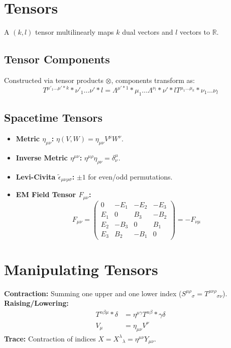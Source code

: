 \documentclass[11pt, a4paper]{report}
\begin{document}
\section{Tensors}
A $(k, l)$ tensor multilinearly maps $k$ dual vectors and $l$ vectors to $\mathbb{R}$.

\subsection*{Tensor Components}
Constructed via tensor products $\otimes$, components transform as:
\begin{equation}
{T^{\mu'_1 \dots \mu'*k}}*{\nu'_1 \dots \nu'*l} = {\Lambda^{\mu'*1}}*{\mu_1} \dots {\Lambda^{\nu_l}}*{\nu'*l} {T^{\mu_1 \dots \mu_k}}*{\nu_1 \dots \nu_l}
\end{equation}

\subsection*{Spacetime Tensors}
\begin{itemize}
\item \textbf{Metric $\eta_{\mu\nu}$:} $\eta(V, W) = \eta_{\mu\nu}V^\mu W^\nu$.
\item \textbf{Inverse Metric $\eta^{\mu\nu}$:} $\eta^{\mu\rho}\eta_{\rho\nu} = \delta^\mu_\nu$.
\item \textbf{Levi-Civita $\tilde{\epsilon}_{\mu\nu\rho\sigma}$:} $\pm 1$ for even/odd permutations.
\item \textbf{EM Field Tensor $F_{\mu\nu}$:}
\begin{equation}\label{eq:EM Field Tensor}
F_{\mu\nu} =
\begin{pmatrix}
0 & -E_1 & -E_2 & -E_3 \\
E_1 & 0 & B_3 & -B_2 \\
E_2 & -B_3 & 0 & B_1 \\
E_3 & B_2 & -B_1 & 0
\end{pmatrix}
= -F_{\nu\mu}
\end{equation}
\end{itemize}

\section{Manipulating Tensors}
\textbf{Contraction:} Summing one upper and one lower index (${S^{\mu\rho}}_\sigma = {T^{\mu\nu\rho}}_{\sigma\nu}$).
\textbf{Raising/Lowering:}
\begin{align}
{T^{\alpha\beta\mu}}*\delta &= \eta^{\mu\gamma} {T^{\alpha\beta}}*{\gamma\delta} \\
V_\mu &= \eta_{\mu\nu}V^\nu
\end{align}
\textbf{Trace:} Contraction of indices $X = {X^\lambda}_\lambda = \eta^{\mu\nu}Y_{\mu\nu}$.
\end{document}
